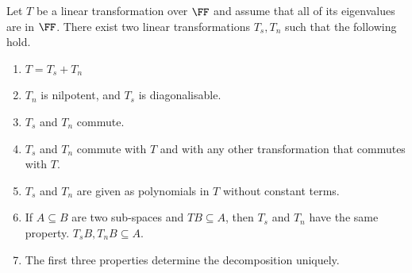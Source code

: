 \documentclass[10pt,a4paper,twoside,openany,hidelinks]{book}
\begin{document}
\begin{theorem}
Let $T$ be a linear transformation over $\FF$ and assume that all of its eigenvalues are in $\FF$. There exist two linear transformations $T_s, T_n$ such that the following hold.
\begin{enumerate}[label = (\roman*)]
\item $T = T_s + T_n$
\item $T_n$ is nilpotent, and $T_s$ is diagonalisable.
\item $T_s$ and $T_n$ commute.
\item $T_s$ and $T_n$ commute with $T$ and with any other transformation that commutes with $T$.
\item $T_s$ and $T_n$ are given as polynomials in $T$ without constant terms.
\item If $A \subseteq B$ are two sub-spaces and $TB \subseteq A$, then $T_s$ and $T_n$ have the same property. $T_s B, T_n B \subseteq A$.
\item The first three properties determine the decomposition uniquely.
\end{enumerate}
\end{theorem}
\end{document}
